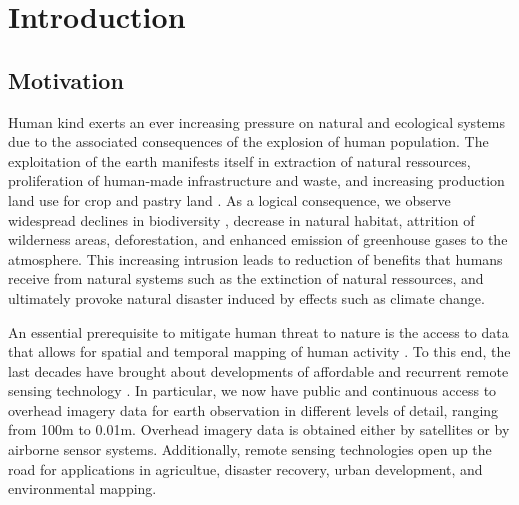 
\chapter{Introduction}

\label{Chapter1}


\section{Motivation}
Human kind exerts an ever increasing pressure on natural and ecological systems due to the associated consequences of the explosion of human population. The exploitation of the earth manifests itself in extraction of natural ressources, proliferation of human-made infrastructure and waste, and increasing production land use for crop and pastry land \parencite{kareiva2007}. As a logical consequence, we observe widespread declines in biodiversity \parencite{newbold2015}, 
decrease in natural habitat, attrition of wilderness areas, deforestation, and enhanced emission of greenhouse gases to the atmosphere. This increasing intrusion leads to reduction of benefits that humans receive from natural systems \parencite{costanza2014} such as the extinction of natural ressources, and ultimately provoke natural disaster induced by effects such as climate change. 

An essential prerequisite to mitigate human threat to nature is the access to data that allows for spatial and temporal mapping of human activity \parencite{raiter2014}. To this end, the last decades have brought about developments of affordable and recurrent remote sensing technology \parencite{hansen2013}. In particular, we now have public and continuous access to overhead imagery data for earth observation in different levels of detail, ranging from 100m to 0.01m. Overhead imagery data is obtained either by satellites or by airborne sensor systems. Additionally, remote sensing technologies open up the road for applications in agricultue, disaster recovery, urban development, and environmental mapping.

